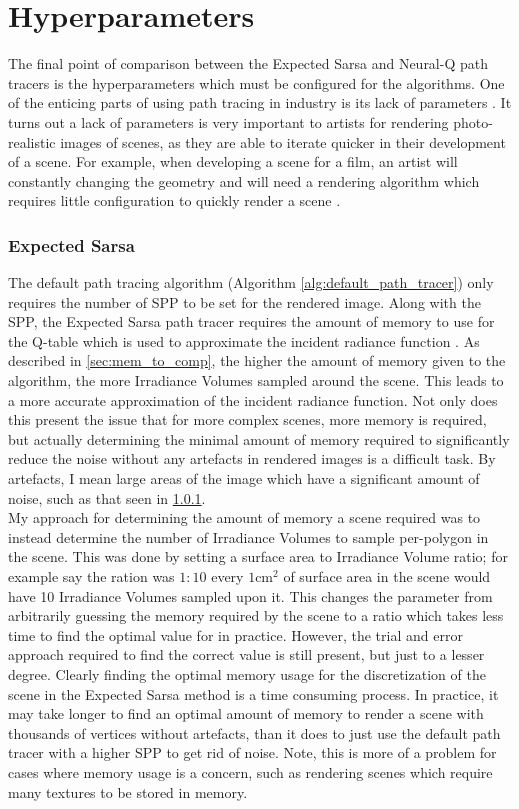 \documentclass[../dissertation.tex]{subfiles}
\begin{document}
\section{Hyperparameters}

The final point of comparison between the Expected Sarsa and Neural-Q path tracers is the hyperparameters which must be configured for the algorithms. One of the enticing parts of using path tracing in industry is its lack of parameters \cite{georgiev2018arnold}. It turns out a lack of parameters is very important to artists for rendering photo-realistic images of scenes, as they are able to iterate quicker in their development of a scene. For example, when developing a scene for a film, an artist will constantly changing the geometry and will need a rendering algorithm which requires little configuration to quickly render a scene \cite{georgiev2018arnold}.

\subsubsection{Expected Sarsa}
The default path tracing algorithm (Algorithm \ref{alg:default_path_tracer}) only requires the number of SPP to be set for the rendered image. Along with the SPP, the Expected Sarsa path tracer requires the amount of memory to use for the Q-table which is used to approximate the incident radiance function \cite{dahm2017learning}. As described in \ref{sec:mem_to_comp}, the higher the amount of memory given to the algorithm, the more Irradiance Volumes sampled around the scene. This leads to a more accurate approximation of the incident radiance function. Not only does this present the issue that for more complex scenes, more memory is required, but actually determining the minimal amount of memory required to significantly reduce the noise without any artefacts in rendered images is a difficult task. By artefacts, I mean large areas of the image which have a significant amount of noise, such as that seen in \ref{}.\\

 My approach for determining the amount of memory a scene required was to instead determine the number of Irradiance Volumes to sample per-polygon in the scene. This was done by setting a surface area to Irradiance Volume ratio; for example say the ration was $1:10$ every $1 \text{cm}^2$ of surface area in the scene would have 10 Irradiance Volumes sampled upon it. This changes the parameter from arbitrarily guessing the memory required by the scene to a ratio which takes less time to find the optimal value for in practice. However, the trial and error approach required to find the correct value is still present, but just to a lesser degree. Clearly finding the optimal memory usage for the discretization of the scene in the Expected Sarsa method is a time consuming process. In practice, it may take longer to find an optimal amount of memory to render a scene with thousands of vertices without artefacts, than it does to just use the default path tracer with a higher SPP to get rid of noise. Note, this is more of a problem for cases where memory usage is a concern, such as rendering scenes which require many textures to be stored in memory.
 
\end{document}
